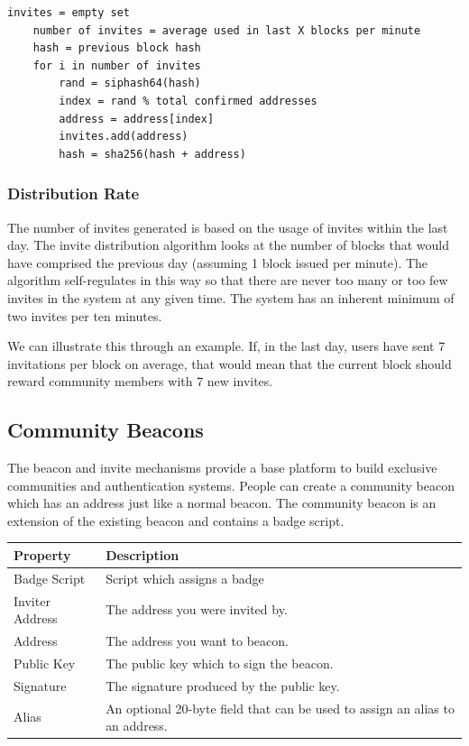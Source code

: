 \documentclass{article}
\begin{document}
\lstset{language=C}
\begin{lstlisting}[caption=Decentralized Invite Algorithm]
    invites = empty set
    number of invites = average used in last X blocks per minute
    hash = previous block hash
    for i in number of invites
        rand = siphash64(hash)
        index = rand % total confirmed addresses
        address = address[index]
        invites.add(address)
        hash = sha256(hash + address)
\end{lstlisting}

\subsubsection{Distribution Rate}

The number of invites generated is based on the usage of invites within the last day.  
The invite distribution algorithm looks at the number of blocks that would have comprised the previous day
(assuming 1 block issued per minute).  The algorithm self-regulates in this way so that 
there are never too many or too few invites in the system at any given time.  The system 
has an inherent minimum of two invites per ten minutes.

We can illustrate this through an example.  If, in the last day, users have sent 7 invitations
per block on average, that would mean that the current block should reward community members with 7 new invites.  

\subsection{Community Beacons}

The beacon and invite mechanisms provide a base platform to build exclusive
communities and authentication systems.  People can create a community beacon
which has an address just like a normal beacon.  The community beacon is an
extension of the existing beacon and contains a badge script.

\begin{center}
    \begin{tabular}{l|p{9cm}}
        Property & Description \\ \hline
        Badge Script & Script which assigns a badge \\
        Inviter Address & The address you were invited by.  \\
        Address & The address you want to beacon.  \\
        Public Key & The public key which to sign the beacon.  \\
        Signature & The signature produced by the public key.  \\
        Alias & An optional 20-byte field that can be used to assign an alias to an address.\\
    \end{tabular}
\end{center}
\end{document}
